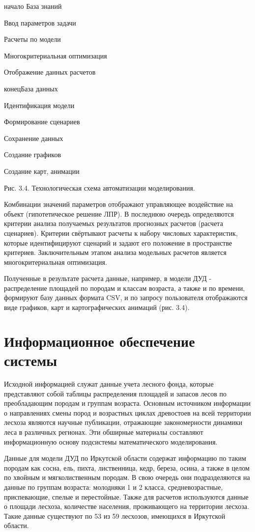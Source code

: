 \begin{center}
начало
База знаний

Ввод параметров задачи

Расчеты по модели

Многокритериальная оптимизация

Отображение данных расчетов

конецБаза данных

Идентификация модели

Формирование сценариев

Сохранение данных

Создание графиков

Создание карт, анимации

Рис. 3.4. Технологическая схема автоматизации
моделирования.
\end{center}

Комбинации значений параметров отображают управляющее воздействие на объект (гипотетическое решение ЛПР). В последнюю очередь определяются критерии\textit{ }анализа получаемых результатов прогнозных расчетов (расчета сценариев). Критерии свёртывают расчеты к набору числовых характеристик, которые идентифицируют сценарий и задают его положение в пространстве\textit{ }критериев. Заключительным этапом анализа модельных расчетов является многокритериальная оптимизация.

Полученные в результате расчета данные, например, в модели ДУД - распределение площадей по породам и классам возраста, а также и по времени, формируют базу данных формата CSV, и по запросу пользователя отображаются виде графиков, карт и  картографических анимаций (рис. 3.4).\label{HToc128995781}\label{HToc199746727}

\section{Информационное обеспечение системы}

Исходной информацией служат данные учета лесного фонда, которые представляют собой таблицы распределения площадей и запасов лесов по преобладающим породам и группам возраста. Основным источником информации о направлениях смены пород и возрастных циклах древостоев на всей территории лесхоза являются научные публикации, отражающие закономерности динамики леса в различных регионах. Эти обширные материалы составляют информационную основу подсистемы математического моделирования.

Данные для модели ДУД по Иркутской области содержат информацию по таким породам как сосна, ель, пихта, лиственница, кедр, береза, осина, а также в целом по хвойным и мягколиственным породам. В свою очередь они подразделяются на данные по группам возраста: молодняки 1 и 2 класса, средневозрастные, приспевающие, спелые и перестойные. Также для расчетов используются данные о площади лесхоза, количестве населения, проживающего на территории лесхоза. Такие данные существуют по 53 из 59 лесхозов, имеющихся в Иркутской области.

